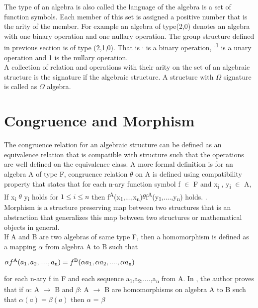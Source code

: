 The type of an algebra is also called the language of the algebra is a set of function symbols. Each member of this set is assigned a positive number that is the arity of the member. For example an algebra of type(2,0) denotes an algebra with one binary operation and one nullary operation. The group structure defined in previous section is of type (2,1,0). That is ∙ is a binary operation, \textsuperscript{-1} is a unary operation and 1 is the nullary operation. \\

A collection of relation and operations with their arity on the set of an algebraic structure is the signature if the algebraic structure. A structure with \(\Omega\) signature is called as \(\Omega\) algebra.

\section{Congruence and Morphism}
The congruence relation for an algebraic structure can be defined as an equivalence relation that is compatible with structure such that the operations are well defined on the equivalence class. A more formal definition is for an algebra A of type F, congruence relation \(\theta\) on A is defined using compatibility property that states that for each n-ary function symbol f \(\in\) F and x\textsubscript{i} , y\textsubscript{i} \(\in\) A, If x\textsubscript{i} \(\theta\) y\textsubscript{i}  holds for \(1\leq i \leq n\) then f\textsuperscript{A}(x\textsubscript{1},...,x\textsubscript{n})\(\theta\)f\textsuperscript{A}(y\textsubscript{1},....,y\textsubscript{n}) holds. \cite{sankappanavar1981course}.\\

Morphism is a structure preserving map between two structures that is an abstraction that generalizes this map between two structures or mathematical objects in general. \\
If A and B are two algebras of same type F, then a homomorphism is defined as a mapping \(\alpha\) from algebra A to B such that
\begin{center}
\(\alpha f\textsuperscript{A}(a\textsubscript{1},a\textsubscript{2},....,a\textsubscript{n}) = f\textsuperscript{B}(\alpha a\textsubscript{1},\alpha a\textsubscript{2},....,\alpha a\textsubscript{n})\)\\
\end{center}
for each n-ary f in F and each sequence a\textsubscript{1},a\textsubscript{2},....,a\textsubscript{n} from A. In \cite{sankappanavar1981course}, the author proves that if \(\alpha\): A \(\rightarrow\) B and \(\beta\): A \(\rightarrow\) B are homomorphisms on algebra A to B such that \(\alpha (a) = \beta (a) \) then \(\alpha\) = \(\beta\)
\\

